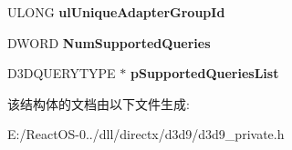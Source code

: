 \begin{DoxyCompactItemize}
U\+L\+O\+NG {\bfseries ul\+Unique\+Adapter\+Group\+Id}
\item 
\mbox{\label{struct___d3_d9___d_r_i_v_e_r_c_a_p_s_aef12d3d49e4d3c476722a5ced2cc9bfc}} 
D\+W\+O\+RD {\bfseries Num\+Supported\+Queries}
\item 
\mbox{\label{struct___d3_d9___d_r_i_v_e_r_c_a_p_s_a4d02d55f042da37eafa587932df623c9}} 
D3\+D\+Q\+U\+E\+R\+Y\+T\+Y\+PE $\ast$ {\bfseries p\+Supported\+Queries\+List}
\end{DoxyCompactItemize}


该结构体的文档由以下文件生成\+:\begin{DoxyCompactItemize}
\item 
E\+:/\+React\+O\+S-\/0../dll/directx/d3d9/d3d9\+\_\+private.\+h\end{DoxyCompactItemize}
